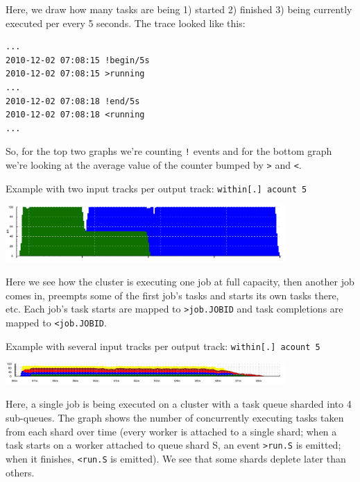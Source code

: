 \documentclass{article}
\begin{document}
Here, we draw how many tasks are being 1) started 2) finished 3) being currently executed per every 5 seconds. The trace looked like this:

\begin{verbatim}
...
2010-12-02 07:08:15 !begin/5s
2010-12-02 07:08:15 >running
...
2010-12-02 07:08:18 !end/5s
2010-12-02 07:08:18 <running
...
\end{verbatim}

So, for the top two graphs we're counting \texttt{!} events and for the bottom graph we're looking at the average value of the counter bumped by \texttt{>} and \texttt{<}.

Example with two input tracks per output track: \texttt{within[.] acount 5}

\centerline{\includegraphics[width=0.8\textwidth]{pics/tplot/tplot-preemption.png}}

Here we see how the cluster is executing one job at full capacity, then another job comes in, preempts some of the first job's tasks and starts its own tasks there, etc. Each job's task starts are mapped to \texttt{>job.JOBID} and task completions are mapped to \texttt{<job.JOBID}.

Example with several input tracks per output track: \texttt{within[.] acount 5}

\centerline{\includegraphics[width=0.8\textwidth]{pics/tplot/tplot-4rmq.png}}

Here, a single job is being executed on a cluster with a task queue sharded into 4 sub-queues. The graph shows the number of concurrently executing tasks taken from each shard over time (every worker is attached to a single shard; when a task starts on a worker attached to queue shard S, an event \texttt{>run.S} is emitted; when it finishes, \texttt{<run.S} is emitted). We see that some shards deplete later than others.

\end{document}
